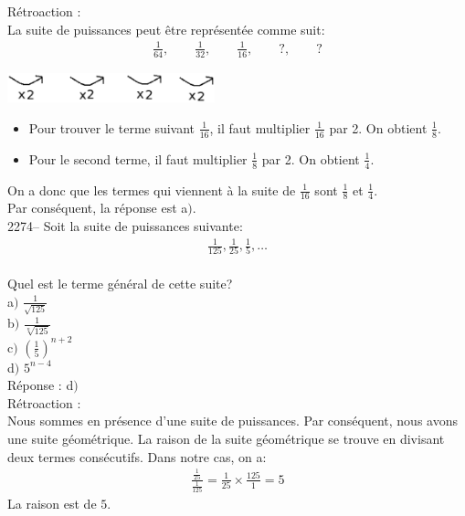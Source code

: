 \documentclass[letterpaper, 12pt]{article}
\begin{document}
R\'etroaction :\\
La suite de puissances peut \^etre repr\'esent\'ee comme suit:\\
\begin{eqnarray*}
\frac{1}{64},\qquad \frac{1}{32},\qquad \frac{1}{16},\qquad ?,\qquad ?
\end{eqnarray*}
\begin{center}
 \includegraphics[width=6cm,bb=0 770 446 842]{Q2273.eps}
\end{center}
\begin{itemize}
 \item Pour trouver le terme suivant $\frac{1}{16}$, il faut multiplier  $\frac{1}{16}$ par 2. On obtient $\frac{1}{8}$.\\
 \item Pour le second terme, il faut multiplier $\frac{1}{8}$ par 2. On obtient $\frac{1}{4}$.\\
\end{itemize}
On a donc que les termes qui viennent \`a la suite de $\frac{1}{16}$ sont $\frac{1}{8}$ et $\frac{1}{4}$.\\
Par cons\'equent, la r\'eponse est a$)$.\\

2274-- Soit la suite de puissances suivante:\\
\begin{eqnarray*}
\frac{1}{125}, \frac{1}{25}, \frac{1}{5},  \ldots
\end{eqnarray*}\\
Quel est le terme g\'en\'eral de cette suite?\\

a$)$ $\frac{1}{\sqrt{125}}$\\[2mm]
b$)$ $\frac{1}{\sqrt[n]{125}}$\\[2mm]
c$)$ $\left( \frac{1}{5}\right) ^{n+2}$\\[2mm]
d$)$ $5^{n-4}$\\

R\'eponse : d$)$\\

R\'etroaction :\\
Nous sommes en pr\'esence d'une suite de puissances. Par cons\'equent, nous avons une suite g\'eom\'etrique. La raison de la suite g\'eom\'etrique se trouve en divisant deux termes cons\'ecutifs. Dans notre cas, on a:
\begin{eqnarray*}
 \frac{\frac{1}{25}}{\frac{1}{125}}=\frac{1}{25}\times \frac{125}{1}= 5
\end{eqnarray*}
La raison est de $5$.\\
\end{document}
